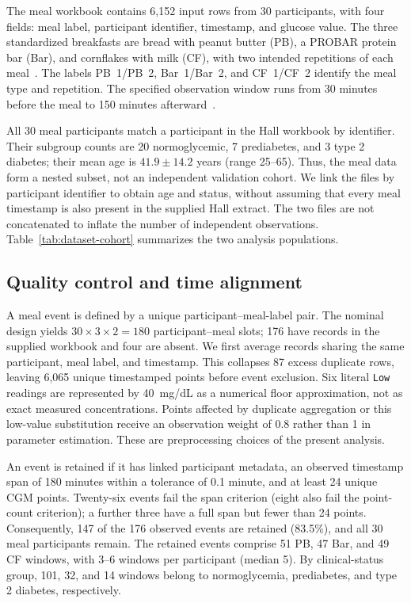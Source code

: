 The meal workbook contains 6,152 input rows from 30 participants, with
four fields: meal label, participant identifier, timestamp, and glucose
value. The three standardized breakfasts are bread with peanut butter
(PB), a PROBAR protein bar (Bar), and cornflakes with milk (CF), with
two intended repetitions of each meal~\cite{hall2018glucotypes}.
The labels PB~1/PB~2, Bar~1/Bar~2, and CF~1/CF~2 identify the meal type
and repetition. The specified observation window runs from 30 minutes
before the meal to 150 minutes afterward~\cite{hall2018mealdata}.

All 30 meal participants match a participant in the Hall workbook by
identifier. Their subgroup counts are 20 normoglycemic, 7 prediabetes,
and 3 type 2 diabetes; their mean age is $41.9\pm14.2$ years (range 25--65).
Thus, the meal data form a nested subset, not an independent validation
cohort. We link the files by participant identifier to obtain age and
status, without assuming that every meal timestamp is also present in
the supplied Hall extract. The two files are not concatenated to inflate
the number of independent observations. Table~\ref{tab:dataset-cohort}
summarizes the two analysis populations.



\subsection{Quality control and time alignment}

A meal event is defined by a unique participant--meal-label pair.
The nominal design yields $30\times3\times2=180$ participant--meal slots;
176 have records in the supplied workbook and four are absent.
We first average records sharing the same participant, meal label, and
timestamp. This collapses 87 excess duplicate rows, leaving 6,065 unique
timestamped points before event exclusion. Six literal \texttt{Low}
readings are represented by 40~mg/dL as a numerical floor approximation,
not as exact measured concentrations. Points affected by duplicate
aggregation or this low-value substitution receive an observation weight
of 0.8 rather than 1 in parameter estimation. These are preprocessing
choices of the present analysis.

An event is retained if it has linked participant metadata, an observed
timestamp span of 180 minutes within a tolerance of 0.1 minute, and at
least 24 unique CGM points. Twenty-six events fail the span criterion
(eight also fail the point-count criterion); a further three have a full
span but fewer than 24 points. Consequently, 147 of the 176 observed
events are retained (83.5\%), and all 30 meal participants remain.
The retained events comprise 51 PB, 47 Bar, and 49 CF windows, with
3--6 windows per participant (median 5). By clinical-status group,
101, 32, and 14 windows belong to normoglycemia, prediabetes, and
type 2 diabetes, respectively.


